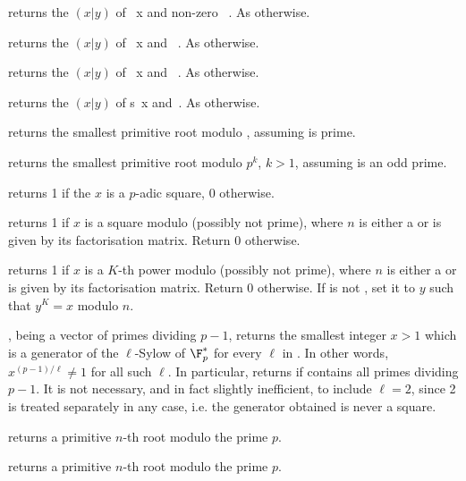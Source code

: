  returns the  $(x|y)$
of ~x and non-zero ~. As  otherwise.

 returns the  $(x|y)$
of ~x and ~. As  otherwise.

 returns the  $(x|y)$
of ~x and ~. As  otherwise.

 returns the  $(x|y)$
of s~x and~. As  otherwise.

 returns the smallest primitive root modulo
, assuming  is prime.

 returns the smallest primitive root modulo $p^k$,
$k > 1$, assuming  is an odd prime.

 returns 1 if the  $x$ is
a $p$-adic square, $0$ otherwise.

 returns 1 if  $x$ is
a square modulo  (possibly not prime), where $n$ is either a 
or is given by its factorisation matrix. Return $0$ otherwise.

 returns 1 if 
$x$ is a $K$-th power modulo  (possibly not prime), where $n$ is
either a  or is given by its factorisation matrix. Return $0$
otherwise. If  is not , set it to $y$ such that $y^K = x$
modulo $n$.

,  being a vector of
primes dividing $p - 1$, returns the smallest integer $x > 1$ which is a
generator of the $\ell$-Sylow of $\F_p^*$ for every $\ell$ in . In
other words, $x^{(p-1)/\ell} \neq 1$ for all such $\ell$. In particular,
returns  if  contains all primes dividing $p - 1$.
It is not necessary, and in fact slightly inefficient, to include $\ell=2$,
since 2 is treated separately in any case, i.e. the generator obtained is
never a square.

 returns a primitive $n$-th root modulo
the prime $p$.

 returns a primitive $n$-th root modulo
the prime $p$.

